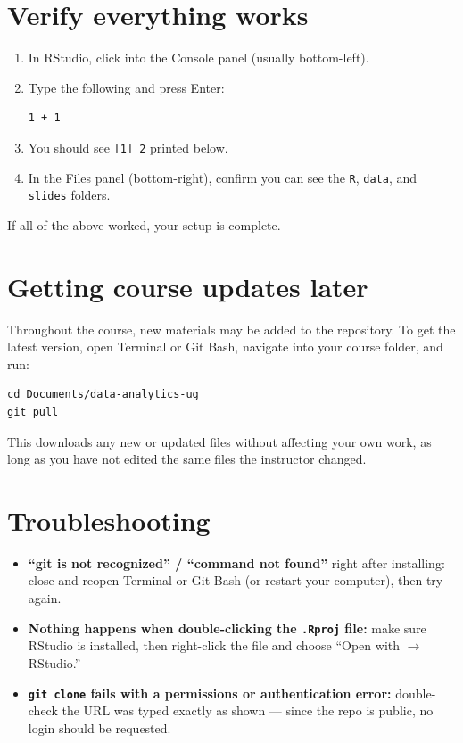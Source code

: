 \documentclass[11pt]{article}
\begin{document}
	\section{Verify everything works}
	\begin{enumerate}
		\item In RStudio, click into the Console panel (usually bottom-left).
		\item Type the following and press Enter:
\begin{lstlisting}
1 + 1
\end{lstlisting}
		\item You should see \texttt{[1] 2} printed below.
		\item In the Files panel (bottom-right), confirm you can see the \texttt{R}, \texttt{data}, and \texttt{slides} folders.
	\end{enumerate}
	If all of the above worked, your setup is complete.
	

	\section{Getting course updates later}
	Throughout the course, new materials may be added to the repository. To get the latest version, open Terminal or Git Bash, navigate into your course folder, and run:
\begin{lstlisting}
cd Documents/data-analytics-ug
git pull
\end{lstlisting}
	This downloads any new or updated files without affecting your own work, as long as you have not edited the same files the instructor changed.
	
	\newpage
	\section{Troubleshooting}
	\begin{itemize}
		\item \textbf{``git is not recognized'' / ``command not found''} right after installing: close and reopen Terminal or Git Bash (or restart your computer), then try again.
		\item \textbf{Nothing happens when double-clicking the \texttt{.Rproj} file:} make sure RStudio is installed, then right-click the file and choose ``Open with $\rightarrow$ RStudio.''
		\item \textbf{\texttt{git clone} fails with a permissions or authentication error:} double-check the URL was typed exactly as shown --- since the repo is public, no login should be requested.
	\end{itemize}
	
\end{document}
